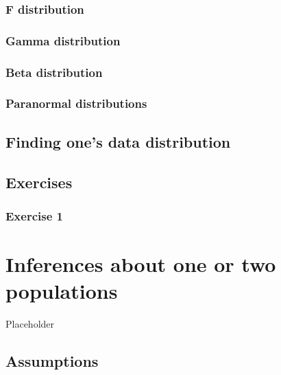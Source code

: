 \documentclass[english,10pt,a4paper,oneside]{book}
\begin{document}
\hypertarget{f-distribution}{%
\subsection{F distribution}\label{f-distribution}}

\hypertarget{gamma-distribution}{%
\subsection{Gamma distribution}\label{gamma-distribution}}

\hypertarget{beta-distribution}{%
\subsection{Beta distribution}\label{beta-distribution}}

\hypertarget{paranormal-distributions}{%
\subsection{Paranormal distributions}\label{paranormal-distributions}}

\hypertarget{finding-ones-data-distribution}{%
\section{Finding one's data distribution}\label{finding-ones-data-distribution}}

\hypertarget{exercises-2}{%
\section{Exercises}\label{exercises-2}}

\hypertarget{exercise-1-2}{%
\subsection{Exercise 1}\label{exercise-1-2}}

\hypertarget{inferences-about-one-or-two-populations}{%
\chapter{Inferences about one or two populations}\label{inferences-about-one-or-two-populations}}

Placeholder

\hypertarget{assumptions}{%
\section{Assumptions}\label{assumptions}}
\end{document}
